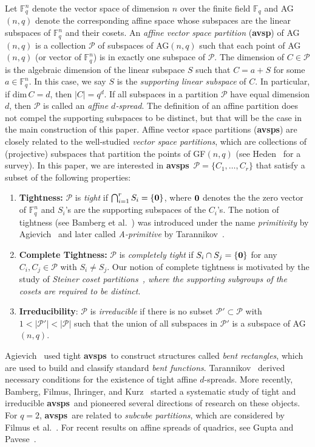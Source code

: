 \documentclass[11pt]{amsart}
\def \P{{\mathcal P}}
\def \F{{\mathbb F}}
\def \dim{\mbox{dim}}
\def \avsp{\mbox{\bf avsp}}
\def \avsps{\mbox{\bf avsps}}
\def \o{\mbox{\bf 0} }
\begin{document}
Let $\F_q^n$ denote the vector space of  dimension $n$ over  the finite field $\F_q$ and AG$(n,q)$ denote the corresponding affine space whose subspaces are the linear subspaces of $\F_q^n$ and their cosets. An {\it affine vector space partition} (\avsp) of AG$(n,q)$ is a collection $\P$ of subspaces of AG$(n,q)$ such that each point of AG$(n,q)$ (or vector of  $\F_q^n$) is in exactly one subspace of $\P$.  The dimension of $C\in\P$ is the algebraic dimension of the linear subspace $S$ such that $C=a+S$ for some $a\in\F_q^n$. In this case, we say  $S$ is the {\it supporting linear subspace} of $C$. In particular, if $\dim\, C=d$, then $|C|=q^d$. 
If all subspaces in a partition $\P$ have equal dimension $d$, then $\P$ is called an {\it affine $d$-spread}. 
 The definition of an affine partition does not compel the supporting subspaces to be distinct, but that will be the case in the main construction of this paper.  Affine vector space partitions (\avsps) are closely related to the well-studied {\it vector space partitions}, which are collections of (projective) subspaces that partition the points of GF$(n,q)$ (see Heden~\cite{He} for a survey).  In this paper, we are interested in \avsps~$\P=\{C_1,\ldots,C_r\}$ that satisfy a subset of the following properties:
\begin{enumerate}
\item[(i)] {\bf Tightness:}
$\P$ is {\it tight} if $\bigcap_{i=1}^r S_i=\{\o\}$, where $\o$ denotes the the zero vector of $\F_q^n$ and $S_i$'s are the supporting subspaces of the $C_i$'s. The notion of tightness (see Bamberg et al.~\cite{BFIK}) was introduced under the name {\it primitivity} by Agievich~\cite{Ag} and later called {\it A-primitive} by Tarannikov~\cite{Ta}.
\item[(ii)] {\bf Complete Tightness:}
$\P$ is {\it completely tight} if $S_i\cap S_j=\{\o\}$ for any $C_i,C_j\in\P$ with $S_i\not=S_j$.  Our notion of complete tightness is motivated by the study of {\it Steiner coset partitions~\cite{AS3}, where the supporting subgroups of the cosets are required to be distinct}.
\item[(iii)] {\bf Irreducibility}:  $\P$ is {\it irreducible}  if there is no subset $\P'\subset \P$ with $1<|\P'|<|\P|$ such that the union of  all subspaces in $\P'$ is a  subspace of AG$(n,q)$. 
\end{enumerate}
Agievich~\cite{Ag} used tight \avsps~to construct structures called {\it bent rectangles}, which are used to build and classify standard {\it bent functions}. Tarannikov~\cite{Ta} derived necessary conditions for the existence of tight  affine $d$-spreads. More recently,  Bamberg, Filmus, Ihringer, and Kurz~\cite{BFIK} started a systematic study of tight and irreducible \avsps~and pioneered several directions of research on these objects. For $q=2$, \avsps~are related to {\it subcube partitions}, which are considered by Filmus et al.~\cite{FHKIRSV}. For recent results on affine spreads of quadrics, see Gupta and Pavese~\cite{GP}.
\end{document}
